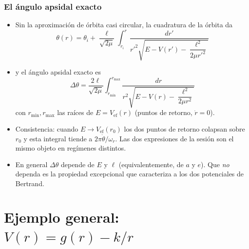 \documentclass[10pt]{beamer}
\newcommand{\Vef}{V_{\mathrm{ef}}}
\newcommand{\dth}{\Delta\theta}          %
\begin{document}
\begin{frame}
\frametitle{El ángulo apsidal exacto}
\begin{itemize}
  \item<1-> Sin la aproximación de órbita casi circular, la cuadratura de la
        órbita da
        \[ \theta(r)=\theta_{i}+\frac{\ell}{\sqrt{2\mu}}
           \int_{r_i}^{r}\frac{dr'}{r'^{2}
           \sqrt{E-V(r')-\dfrac{\ell^{2}}{2\mu r'^{2}}}} \]
  \item<2-> y el ángulo apsidal exacto es
        \[ \boxed{\;\dth=\frac{2\ell}{\sqrt{2\mu}}
           \int_{r_{\min}}^{r_{\max}}\frac{dr}{r^{2}
           \sqrt{E-V(r)-\dfrac{\ell^{2}}{2\mu r^{2}}}}\;} \]
        con $r_{\min},r_{\max}$ las raíces de $E=\Vef(r)$ (puntos de retorno,
        $\dot r=0$).
  \item<3-> \alert{Consistencia:} cuando $E\to\Vef(r_0)$ los dos puntos de
        retorno colapsan sobre $r_0$ y esta integral tiende a
        $2\pi\dot\theta/\omega_r$. Las dos expresiones de la sesión son el
        mismo objeto en regímenes distintos.
  \item<4-> En general $\dth$ depende de $E$ y $\ell$ (equivalentemente, de $a$
        y $e$). Que \emph{no} dependa es la propiedad excepcional que
        caracteriza a los dos potenciales de Bertrand.
\end{itemize}
\end{frame}

\section{Ejemplo general: $V(r)=g(r)-k/r$}
\end{document}
